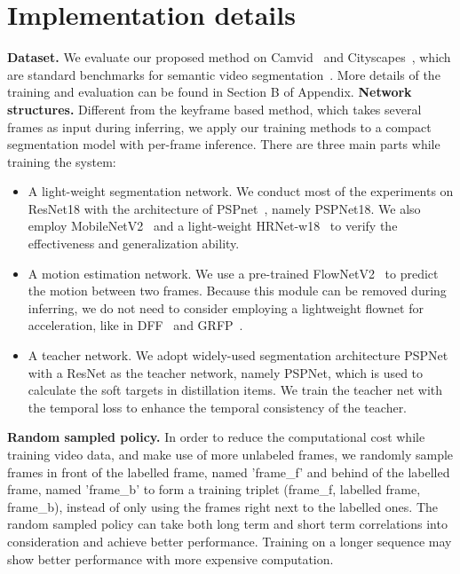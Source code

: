 \documentclass[runningheads]{llncs}
\begin{document}
\section{Implementation details}
\noindent\textbf{Dataset.} We evaluate our proposed method on Camvid~\cite{brostow2008segmentation} and Cityscapes~\cite{Cordts2016Cityscapes}, which are standard benchmarks for semantic video segmentation~\cite{jain2019accel,shelhamer2016clockwork,nilsson2018semantic}. More details of the training and evaluation can be found in Section B of Appendix.
\noindent\textbf{Network structures.}
Different from the keyframe based method, which takes several frames as input during inferring, we apply our training methods to a compact segmentation model with per-frame inference. There are three main parts while training the system:
\begin{itemize}
    \setlength{\itemsep}{0pt}
    \setlength{\parskip}{0pt}
    \setlength{\parsep}{0pt}
    \item A light-weight segmentation network. We conduct most of the experiments on ResNet18 with the architecture of PSPnet~\cite{zhao2017pyramid}, namely PSPNet18. We also employ MobileNetV2~\cite{Sandler2018MobileNetV2IR} and a light-weight HRNet-w18~\cite{SunZJCXLMWLW19} to verify the effectiveness and
generalization ability.
    \item A motion estimation network. We use a pre-trained FlowNetV2~\cite{flownet2-pytorch} to predict the motion between two frames. Because this module can be removed during inferring, we do not need to consider employing a lightweight flownet for acceleration, like in DFF~\cite{zhu2017deep} and GRFP~\cite{nilsson2018semantic}.

    \item A teacher network. We adopt widely-used segmentation architecture PSPNet \cite{zhao2017pyramid} with a ResNet \cite{He2016DeepRL} as the teacher network, namely PSPNet, which is used to calculate the soft targets in distillation items. We train the teacher net with the temporal loss to enhance the temporal consistency of the teacher.

\end{itemize}


\noindent\textbf{Random sampled policy.}
In order to reduce the computational cost while training video data, and make use of more unlabeled frames, we randomly sample frames in front of the labelled frame, named 'frame\_f' and behind of the labelled frame, named 'frame\_b' to form a training triplet (frame\_f, labelled frame, frame\_b), instead of only using the frames right next to the labelled ones. The random sampled policy can take both long term and short term correlations into consideration and achieve better performance. Training on a longer sequence may
show
better performance with
more expensive computation.
\end{document}
